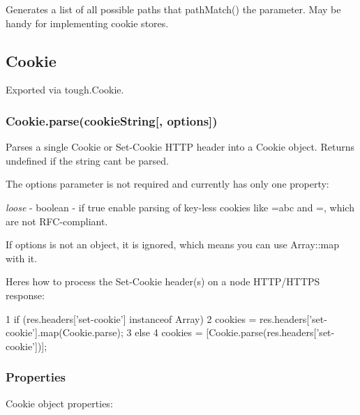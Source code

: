 Generates a list of all possible paths that {\ttfamily path\+Match()} the parameter. May be handy for implementing cookie stores.

\subsection*{Cookie}

Exported via {\ttfamily tough.\+Cookie}.

\subsubsection*{{\ttfamily Cookie.\+parse(cookie\+String\mbox{[}, options\mbox{]})}}

Parses a single Cookie or Set-\/\+Cookie H\+T\+T\+P header into a {\ttfamily Cookie} object. Returns {\ttfamily undefined} if the string can\textquotesingle{}t be parsed.

The options parameter is not required and currently has only one property\+:


\begin{DoxyItemize}
\item {\itshape loose} -\/ boolean -\/ if {\ttfamily true} enable parsing of key-\/less cookies like {\ttfamily =abc} and {\ttfamily =}, which are not R\+F\+C-\/compliant.
\end{DoxyItemize}

If options is not an object, it is ignored, which means you can use {\ttfamily Array\+::map} with it.

Here\textquotesingle{}s how to process the Set-\/\+Cookie header(s) on a node H\+T\+T\+P/\+H\+T\+T\+P\+S response\+:


\begin{DoxyCode}
1 if (res.headers['set-cookie'] instanceof Array)
2   cookies = res.headers['set-cookie'].map(Cookie.parse);
3 else
4   cookies = [Cookie.parse(res.headers['set-cookie'])];
\end{DoxyCode}


\subsubsection*{Properties}

Cookie object properties\+:


